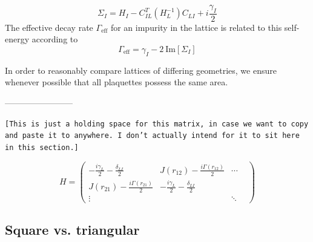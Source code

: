\documentclass[aps,pra,superscriptaddress,twocolumn]{revtex4-1}
\newcommand{\im}{\mathrm{Im}}
\newcommand{\commentSB}[1]{\texttt{\color{blue}[#1]}}
\newcommand{\commentTP}[1]{\texttt{\color{green}[#1]}}
\begin{document}
\begin{equation}
    \Sigma_I = H_I - C_{IL}^T (H_L^{-1}) C_{LI} + i \frac{\gamma_I}{2}
    \label{eqn:selfenergy}
\end{equation}
The effective decay rate $\Gamma_\text{eff}$ for an impurity in the lattice is related to this self-energy according to 
\begin{equation}
    \Gamma_\text{eff} = \gamma_I - 2~\im[\Sigma_I]
\end{equation}






In order to reasonably compare lattices of differing geometries, we ensure whenever possible that all plaquettes possess the same area.

------------------------

\commentSB{This is just a holding space for this matrix, in case we want to copy and paste it to anywhere. I don't actually intend for it to sit here in this section.}

\begin{equation}
    H = 
    \begin{pmatrix}
        -\frac{i \gamma_L}{2} - \frac{\delta_{LI}}{2} & J(r_{12}) - \frac{i \Gamma(r_{12})}{2} & \cdots \\
        J(r_{21}) - \frac{i \Gamma(r_{21})}{2} & -\frac{i \gamma_L}{2} - \frac{\delta_{LI}}{2} & & \\
        \vdots & & \ddots
    \end{pmatrix}
\end{equation}


\subsection{Square vs. triangular}
\end{document}
